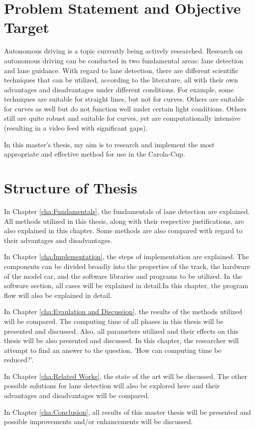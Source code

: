 \section{Problem Statement and Objective Target}\label{sec:Problem Statement and Objective Target}


Autonomous driving is a topic currently being actively researched. Research on autonomous driving can be conducted in two fundamental areas: lane detection and lane guidance. With regard to lane detection, there are different scientific techniques that can be utilized, according to the literature, all with their own advantages and disadvantages under different conditions. For example, some techniques are suitable for straight lines, but not for curves. Others are suitable for curves as well but do not function well under certain light conditions. Others still are quite robust and suitable for curves, yet are computationally intensive (resulting in a video feed with significant gaps). 

In this master's thesis, my aim is to research and implement the most appropriate and effective method for use in the Carola-Cup.


\section{Structure of Thesis}\label{sec:Structure of Thesis}


In Chapter \ref{cha:Fundamentals}, the fundamentals of lane detection are explained. All methods utilized in this thesis, along with their respective justifications, are also explained in this chapter. Some methods are also compared with regard to their advantages and disadvantages.


In Chapter \ref{cha:Implementation}, the steps of implementation are explained. The components can be divided broadly into the properties of the track, the hardware of the model car, and the software libraries and programs to be utilized. In the software section, all cases will be explained in detail.In this chapter, the program flow will also be explained in detail.

In Chapter \ref{cha:Evaulation and Discussion}, the results of the methods utilized will be compared. The computing time of all phases in this thesis will be presented and discussed. Also, all parameters utilized and their effects on this thesis will be also presented and discussed. In this chapter, the researcher will attempt to find an answer to the question, 'How can computing time be reduced?'.

In Chapter \ref{cha:Related Works}, the state of the art will be discussed. The other possible solutions for lane detection will also be explored here and their advantages and disadvantages will be compared.

In Chapter \ref{cha:Conclusion}, all results of this master thesis will be presented and possible improvements and/or enhancements will be discussed.



